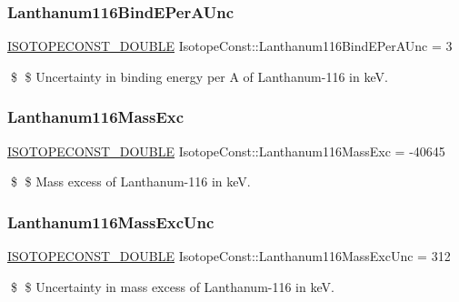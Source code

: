\subsubsection{\texorpdfstring{Lanthanum116\+Bind\+E\+Per\+A\+Unc}{Lanthanum116BindEPerAUnc}}
{\footnotesize\ttfamily \mbox{\hyperlink{group___isotope_const-_macros_ga8f45a7272ce02c0b4c65c44636ed719a}{I\+S\+O\+T\+O\+P\+E\+C\+O\+N\+S\+T\+\_\+\+D\+O\+U\+B\+LE}} Isotope\+Const\+::\+Lanthanum116\+Bind\+E\+Per\+A\+Unc = 3}

\$ \$ Uncertainty in binding energy per A of Lanthanum-\/116 in keV. \mbox{\label{group___isotope_const-_lanthanum-_la116_gac07bb2ce502e500996fc9e7f9acc6959}} 
\subsubsection{\texorpdfstring{Lanthanum116\+Mass\+Exc}{Lanthanum116MassExc}}
{\footnotesize\ttfamily \mbox{\hyperlink{group___isotope_const-_macros_ga8f45a7272ce02c0b4c65c44636ed719a}{I\+S\+O\+T\+O\+P\+E\+C\+O\+N\+S\+T\+\_\+\+D\+O\+U\+B\+LE}} Isotope\+Const\+::\+Lanthanum116\+Mass\+Exc = -\/40645}

\$ \$ Mass excess of Lanthanum-\/116 in keV. \mbox{\label{group___isotope_const-_lanthanum-_la116_gaafa08e39966ffceb5c01b171de3385b0}} 
\subsubsection{\texorpdfstring{Lanthanum116\+Mass\+Exc\+Unc}{Lanthanum116MassExcUnc}}
{\footnotesize\ttfamily \mbox{\hyperlink{group___isotope_const-_macros_ga8f45a7272ce02c0b4c65c44636ed719a}{I\+S\+O\+T\+O\+P\+E\+C\+O\+N\+S\+T\+\_\+\+D\+O\+U\+B\+LE}} Isotope\+Const\+::\+Lanthanum116\+Mass\+Exc\+Unc = 312}

\$ \$ Uncertainty in mass excess of Lanthanum-\/116 in keV. \mbox{\label{group___isotope_const-_lanthanum-_la116_gab922bc0748674819ae0057f660bd1d2c}} 
